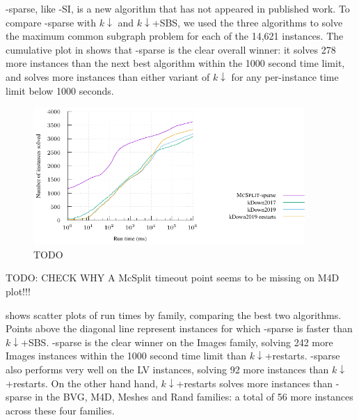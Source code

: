 \McSplit-sparse, like \McSplit-SI, is a new algorithm that
has not appeared in published work.
To compare \McSplit-sparse with $k\downarrow$ and $k\downarrow$+SBS,
we used the three algorithms to solve the maximum
common subgraph problem for each of the 14,621 instances.
The cumulative plot in  
shows that \McSplit-sparse is the clear overall winner: it solves
278 more instances than the next best algorithm within the 1000 second
time limit, and solves more instances than either variant of $k\downarrow$
for any per-instance time limit below 1000 seconds.

\begin{figure}[htb]
    \centering
    \includegraphics*[width=0.92\textwidth]{14b-mcsplit-induced-si/sip-instances-mcis-experiment/experiment/plots/cumulative.pdf}
    \caption{TODO}
    \label{figure:mcsplit-sparse-cumulative}
\end{figure}

TODO: CHECK WHY A McSplit timeout point seems to be missing on M4D plot!!!

 shows scatter plots
of run times by family, comparing the best two algorithms.  Points
above the diagonal line represent instances for which \McSplit-sparse
is faster than $k\downarrow$+SBS. 
\McSplit-sparse is the clear winner on the Images family,
solving 242 more Images instances
within the 1000 second time limit than $k\downarrow$+restarts.
\McSplit-sparse also performs very well on the LV instances,
solving 92 more instances than $k\downarrow$+restarts.
On the other hand
hand, $k\downarrow$+restarts solves more instances than \McSplit-sparse in the
BVG, M4D, Meshes and Rand families: a total of 56 more instances across these
four families.

